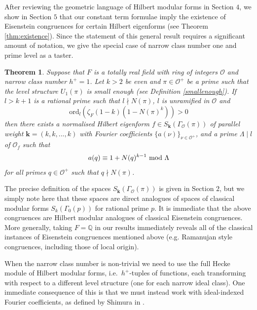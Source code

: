 \documentclass[a4paper,oneside]{amsart}
\theoremstyle{plain}
\newtheorem{thm}{Theorem}[section]
\theoremstyle{definition}
\begin{document}
After reviewing the geometric language of Hilbert modular forms in Section $4$, we show in Section $5$ that our constant term formulae imply the existence of Eisenstein congruences for certain Hilbert eigenforms (see Theorem \ref{thm:existence}). Since the statement of this general result requires a significant amount of notation, we give the special case of narrow class number one and prime level as a taster.

\begin{thm}

Suppose that $F$ is a totally real field with ring of integers $\mathcal{O}$ and narrow class number $h^+ = 1$. Let $k>2$ be even and $\pi\in\mathcal{O}^+$ be a prime such that the level structure $U_1(\pi)$ is small enough (see Definition \ref{smallenough}). If $l > k+1$ is a rational prime such that $l\nmid N(\pi)$, $l$ is unramified in $\mathcal{O}$ and
\begin{equation*}
    \text{ord}_{l}(\zeta_F(1-k)(1-N(\pi)^k)) > 0
\end{equation*}
then there exists a normalised Hilbert eigenform $f \in S_{\textbf{k}}(\Gamma_{\mathcal{O}}(\pi))$ of parallel weight $\textbf{k} = (k,k,...,k)$ with Fourier coefficients $\{a(\nu)\}_{\nu\in\mathcal{O}^+}$, and a prime $\Lambda \mid l$ of $\mathcal{O}_f$ such that
\begin{equation*}
    a(q) \equiv 1+N(q)^{k-1} \ \textnormal{mod } \Lambda
\end{equation*} for all primes $q\in\mathcal{O}^+$ such that $q \nmid N(\pi)$.
\end{thm}

The precise definition of the spaces $S_{\textbf{k}}(\Gamma_{\mathcal{O}}(\pi))$ is given in Section $2$, but we simply note here that these spaces are direct analogues of spaces of classical modular forms $S_k(\Gamma_0(p))$ for rational prime $p$. It is immediate that the above congruences are Hilbert modular analogues of classical Eisenstein congruences. More generally, taking $F = \mathbb{Q}$ in our results immediately reveals all of the classical instances of Eisenstein congruences mentioned above (e.g. Ramanujan style congruences, including those of local origin). 

When the narrow class number is non-trivial we need to use the full Hecke module of Hilbert modular forms, i.e.\ $h^+$-tuples of functions, each transforming with respect to a different level structure (one for each narrow ideal class). One immediate consequence of this is that we must instead work with ideal-indexed Fourier coefficients, as defined by Shimura in \cite{shimura}.
\end{document}
